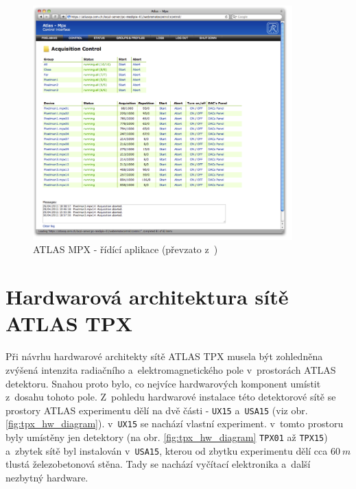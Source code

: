 \begin{figure}[ht]
	\begin{center}
		\includegraphics[width=10cm]{figures/mpx_web.png}
		\caption{ATLAS MPX - řídící aplikace (převzato z~\cite{TurecekThesis2011})}
		\label{fig:mpx_web}
	\end{center}
\end{figure}

\section{Hardwarová architektura sítě ATLAS TPX}\label{atlas:hw_arch}
Při návrhu hardwarové architekty sítě ATLAS TPX musela být zohledněna zvýšená intenzita radiačního a~elektromagnetického pole v~prostorách ATLAS detektoru. Snahou proto bylo, co nejvíce hardwarových komponent umístit z~dosahu tohoto pole. Z~pohledu hardwarové instalace této detektorové sítě se prostory ATLAS experimentu dělí na dvě části - \texttt{UX15} a~\texttt{USA15} (viz obr. \ref{fig:tpx_hw_diagram}). v~\texttt{UX15} se nachází vlastní experiment. v~tomto prostoru byly umístěny jen detektory (na obr. \ref{fig:tpx_hw_diagram} \texttt{TPX01} až \texttt{TPX15}) a~zbytek sítě byl instalován v~\texttt{USA15}, kterou od zbytku experimentu dělí cca $60~m$ tlustá železobetonová stěna. Tady se nachází vyčítací elektronika a~další nezbytný hardware.

